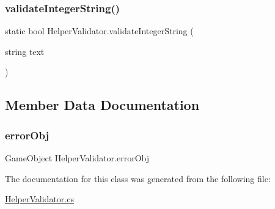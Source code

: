 \mbox{\label{class_helper_validator_ae2a4197b74ecf12c37770790da74149f}} 
\subsubsection{\texorpdfstring{validate\+Integer\+String()}{validateIntegerString()}}
{\footnotesize\ttfamily static bool Helper\+Validator.\+validate\+Integer\+String (\begin{DoxyParamCaption}\item[{string}]{text }\end{DoxyParamCaption})\hspace{0.3cm}{\ttfamily [static]}}



\subsection{Member Data Documentation}
\mbox{\label{class_helper_validator_aa83d9143271cabe1e41f61d94304c960}} 
\subsubsection{\texorpdfstring{error\+Obj}{errorObj}}
{\footnotesize\ttfamily Game\+Object Helper\+Validator.\+error\+Obj\hspace{0.3cm}{\ttfamily [static]}}



The documentation for this class was generated from the following file\+:\begin{DoxyCompactItemize}
\item 
\mbox{\hyperlink{_helper_validator_8cs}{Helper\+Validator.\+cs}}\end{DoxyCompactItemize}
